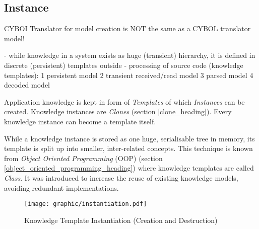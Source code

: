 %
%
%
%
%
%
%

\subsection{Instance}
\label{instance_heading}

CYBOI Translator for model creation is NOT the same as a CYBOL translator model!

- while knowledge in a system exists as huge (transient) hierarchy,
it is defined in discrete (persistent) templates outside
- processing of source code (knowledge templates):
1 persistent model
2 transient received/read model
3 parsed model
4 decoded model

Application knowledge is kept in form of \emph{Templates} of which \emph{Instances}
can be created. Knowledge instances are \emph{Clones} (section \ref{clone_heading}).
Every knowledge instance can become a template itself.

While a knowledge instance is stored as one huge, serialisable tree in memory,
its template is split up into smaller, inter-related concepts. This technique
is known from \emph{Object Oriented Programming} (OOP) (section
\ref{object_oriented_programming_heading}) where knowledge templates are called
\emph{Class}. It was introduced to increase the reuse of existing knowledge
models, avoiding redundant implementations.

\begin{figure}[ht]
    \begin{center}
        \texttt{[image: graphic/instantiation.pdf]}
        \caption{Knowledge Template Instantiation (Creation and Destruction)}
        \label{instantiation_figure}
    \end{center}
\end{figure}
